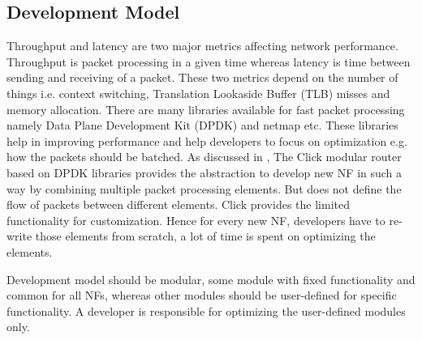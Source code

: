\documentclass[10pt, a4paper, conference]{IEEEtran}
\begin{document}
\subsection{Development Model}
Throughput and latency are two major metrics affecting network performance. Throughput is packet processing in a given time whereas latency is time between sending and receiving of a packet. These two metrics depend on the number of things \cite{Philippov2017}i.e. context switching, Translation Lookaside Buffer (TLB) misses and memory allocation. There are many libraries available for fast packet processing namely Data Plane Development Kit (DPDK)\cite{Corporation2014} and netmap etc. %
 These libraries help in improving performance and help developers to focus on optimization e.g. how the packets should be batched. 
As discussed in \cite{Panda2016}, The Click modular router \cite{Kohler2000} based on DPDK libraries provides the abstraction to develop new NF in such a way by combining multiple packet processing elements. But does not define the flow of packets between different elements. Click\cite{Martins2014} provides the limited functionality for customization. Hence for every new NF, developers have to re-write those elements from scratch, a lot of time is spent on optimizing the elements. 

Development model should be modular, some module with fixed functionality and common for all NFs, whereas other modules should be user-defined for specific functionality. A developer is responsible for optimizing the user-defined modules only.
\end{document}
